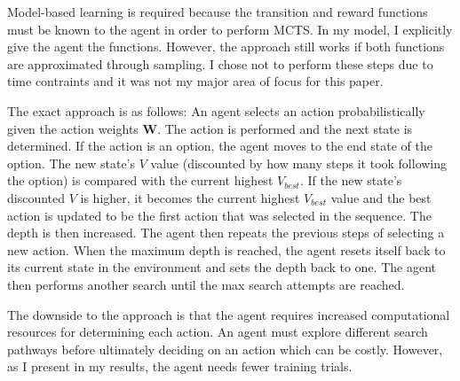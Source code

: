 Model-based learning is required because the transition and reward functions must be known to the agent in order to perform MCTS. In my model, I explicitly give the agent the functions. However, the approach still works if both functions are approximated through sampling. I chose not to perform these steps due to time contraints and it was not my major area of focus for this paper.


The exact approach is as follows: An agent selects an action probabilistically given the action weights \textbf{W}. The action is performed and the next state is determined. If the action is an option, the agent moves to the end state of the option. The new state's $V$ value (discounted by how many steps it took following the option) is compared with the current highest $V_{best}$. If the new state's discounted $V$ is higher, it becomes the current highest $V_{best}$ value and the best action is updated to be the first action that was selected in the sequence. The depth is then increased. The agent then repeats the previous steps of selecting a new action. When the maximum depth is reached, the agent resets itself back to its current state in the environment and sets the depth back to one. The agent then performs another search until the max search attempts are reached.

The downside to the approach is that the agent requires increased computational resources for determining each action. An agent must explore different search pathways before ultimately deciding on an action which can be costly. However, as I present in my results, the agent needs fewer training trials.



